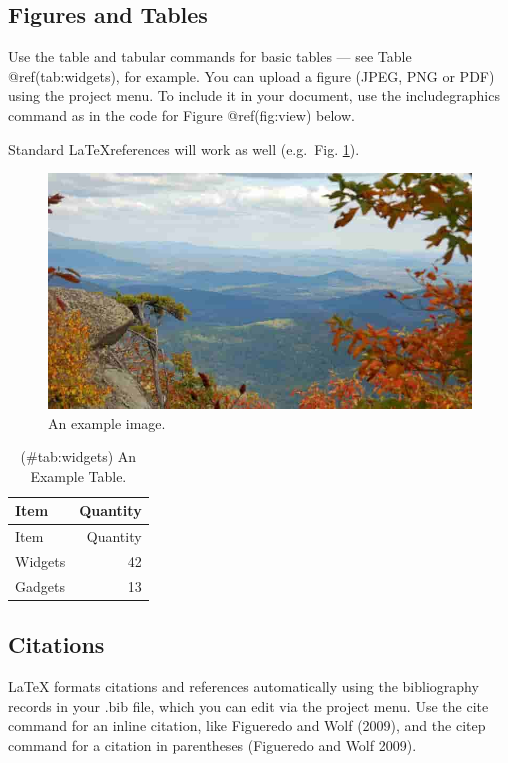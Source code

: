 \documentclass[fleqn,10pt,lineno]{wlpeerj} %
\begin{document}
\hypertarget{figures-and-tables}{%
\subsection*{Figures and Tables}\label{figures-and-tables}}

Use the table and tabular commands for basic tables --- see Table
@ref(tab:widgets), for example. You can upload a figure (JPEG, PNG or
PDF) using the project menu. To include it in your document, use the
includegraphics command as in the code for Figure @ref(fig:view) below.

Standard \LaTeX references will work as well (e.g.~Fig. \ref{fig:view}).

\begin{figure}
\includegraphics[width=1\linewidth]{view} \caption{An example image.}\label{fig:view}
\end{figure}

\begin{longtable}[]{@{}lr@{}}
\caption{(\#tab:widgets) An Example Table.}\tabularnewline
\toprule
Item & Quantity \\
\midrule
\endfirsthead
\toprule
Item & Quantity \\
\midrule
\endhead
Widgets & 42 \\
Gadgets & 13 \\
\bottomrule
\end{longtable}

\hypertarget{citations}{%
\subsection*{Citations}\label{citations}}

LaTeX formats citations and references automatically using the
bibliography records in your .bib file, which you can edit via the
project menu. Use the cite command for an inline citation, like
Figueredo and Wolf (2009), and the citep command for a citation in
parentheses (Figueredo and Wolf 2009).
\end{document}
